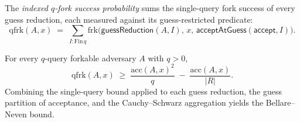 \begin{definition}
  \label{def:qfork-succ-prob}
  \leanok
  The \emph{indexed $q$-fork success probability} sums the single-query fork
  success of every guess reduction, each measured against its guess-restricted
  predicate:
  \[
    \mathrm{qfrk}(A,x) \;=\;
    \sum_{I : \mathrm{Fin}\,q}
      \mathrm{frk}\big(\mathsf{guessReduction}(A,I),\, x,\, \mathsf{acceptAtGuess}(\mathsf{accept},I)\big).
  \]
\end{definition}

\begin{theorem}
  \label{thm:qfork-success-ge}
  \leanok
  For every $q$-query forkable adversary $A$ with $q > 0$,
  \[
    \mathrm{qfrk}(A,x) \;\geq\;
    \frac{\mathrm{acc}(A,x)^2}{q} \;-\; \frac{\mathrm{acc}(A,x)}{\lvert R\rvert}.
  \]
  Combining the single-query bound applied to each guess reduction, the guess
  partition of acceptance, and the Cauchy--Schwarz aggregation yields the
  Bellare--Neven bound.
\end{theorem}
